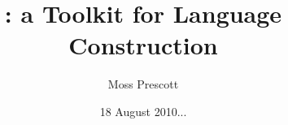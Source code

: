 \documentclass[12pt]{amsart}
\title{\Meta: a Toolkit for Language Construction}
\author{Moss Prescott}
\date{18 August 2010...}
\begin{document}
\begin{abstract}

\end{abstract}

\maketitle


\tableofcontents








%
%
%
%


\end{document}
